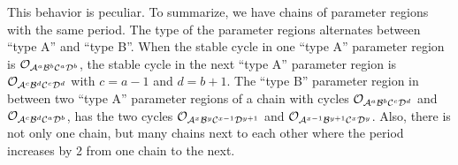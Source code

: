 This behavior is peculiar.
To summarize, we have chains of parameter regions with the same period.
The type of the parameter regions alternates between ``type A'' and ``type B''.
When the stable cycle in one ``type A'' parameter region is $\mathcal{O}_{\mathcal{A}^a\mathcal{B}^b\mathcal{C}^a\mathcal{D}^b}$, the stable cycle in the next ``type A'' parameter region is $\mathcal{O}_{\mathcal{A}^{c}\mathcal{B}^{d}\mathcal{C}^{c}\mathcal{D}^{d}}$ with $c = a - 1$ and $d = b + 1$.
The ``type B'' parameter region in between two ``type A'' parameter regions of a chain with cycles $\mathcal{O}_{\mathcal{A}^a\mathcal{B}^b\mathcal{C}^c\mathcal{D}^d}$ and $\mathcal{O}_{\mathcal{A}^{c}\mathcal{B}^{d}\mathcal{C}^{a}\mathcal{D}^{b}}$, has the two cycles $\mathcal{O}_{\mathcal{A}^x\mathcal{B}^y\mathcal{C}^{x-1}\mathcal{D}^{y+1}}$ and $\mathcal{O}_{\mathcal{A}^{x-1}\mathcal{B}^{y+1}\mathcal{C}^x\mathcal{D}^y}$.
Also, there is not only one chain, but many chains next to each other where the period increases by 2 from one chain to the next.
